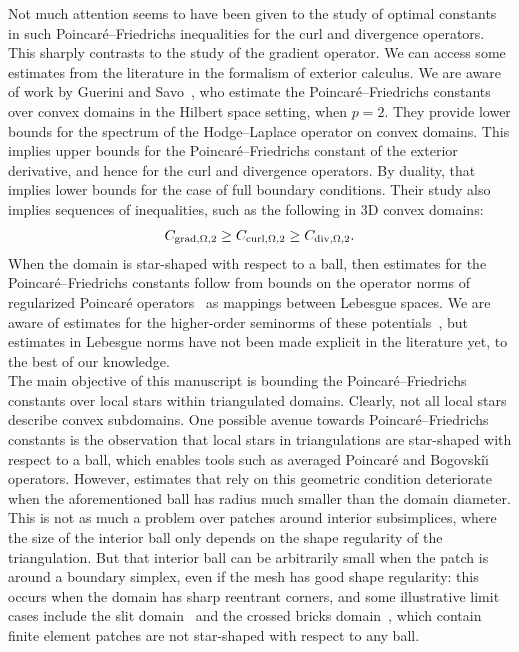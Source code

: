 \documentclass[12pt,a4paper]{article}
\begin{document}
Not much attention seems to have been given to the study of optimal constants in such Poincar\'e--Friedrichs inequalities for the curl and divergence operators. 
This sharply contrasts to the study of the gradient operator. 
%
We can access some estimates from the literature in the formalism of exterior calculus. 
We are aware of work by Guerini and Savo~\cite{guerini2004eigenvalue}, who estimate the Poincar\'e--Friedrichs constants over convex domains in the Hilbert space setting, when $p=2$. They provide lower bounds for the spectrum of the Hodge--Laplace operator on convex domains. This implies upper bounds for the Poincar\'e--Friedrichs constant of the exterior derivative, and hence for the curl and divergence operators.
By duality, that implies lower bounds for the case of full boundary conditions.
Their study also implies sequences of inequalities, such as the following in 3D convex domains:
\begin{align}\label{math:intro:guerinisavo}
    C_{\operatorname{grad},\Omega,2} \geq C_{\operatorname{curl},\Omega,2} \geq C_{\operatorname{div},\Omega,2}.
\end{align}
When the domain is star-shaped with respect to a ball, then estimates for the Poincar\'e--Friedrichs constants 
follow from bounds on the operator norms of regularized Poincar\'e operators~\cite{costabel2010bogovskiui}
as mappings between Lebesgue spaces. 
We are aware of estimates for the higher-order seminorms of these potentials~\cite{guzman2021estimation},
but estimates in Lebesgue norms have not been made explicit in the literature yet, to the best of our knowledge.
\\


The main objective of this manuscript is bounding the Poincar\'e--Friedrichs constants over local stars within triangulated domains. 
Clearly, not all local stars describe convex subdomains. 
One possible avenue towards Poincar\'e--Friedrichs constants is the observation that local stars in triangulations are star-shaped with respect to a ball,
which enables tools such as averaged Poincar\'e and Bogovski\u{\i} operators. 
However, estimates that rely on this geometric condition deteriorate when the aforementioned ball has radius much smaller than the domain diameter. 
This is not as much a problem over patches around interior subsimplices, where the size of the interior ball only depends on the shape regularity of the triangulation. 
But that interior ball can be arbitrarily small when the patch is around a boundary simplex, even if the mesh has good shape regularity: 
this occurs when the domain has sharp reentrant corners, and some illustrative limit cases include the slit domain~\cite{veeser2012poincare} and the crossed bricks domain~\cite{licht2019smoothed}, %
which contain finite element patches are not star-shaped with respect to any ball. 
\end{document}
